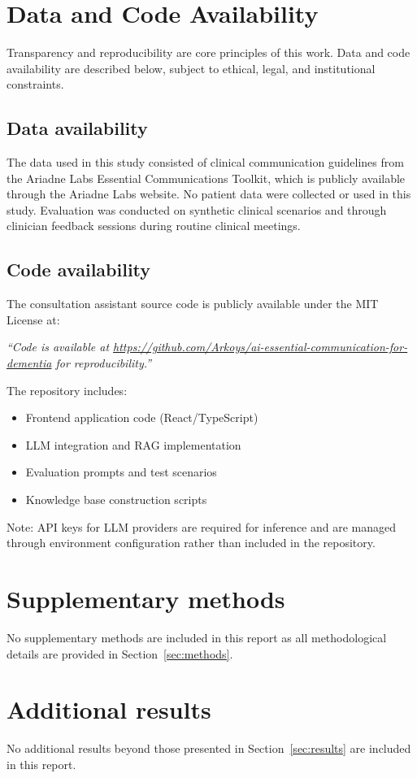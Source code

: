 \section*{Data and Code Availability}

Transparency and reproducibility are core principles of this work.
Data and code availability are described below,
subject to ethical, legal, and institutional constraints.

\subsection*{Data availability}

The data used in this study consisted of clinical communication guidelines from the Ariadne Labs Essential Communications Toolkit, which is publicly available through the Ariadne Labs website. No patient data were collected or used in this study. Evaluation was conducted on synthetic clinical scenarios and through clinician feedback sessions during routine clinical meetings.

\subsection*{Code availability}

The consultation assistant source code is publicly available under the MIT License at:

\textit{``Code is available at \url{https://github.com/Arkoys/ai-essential-communication-for-dementia} for reproducibility.''}

The repository includes:
\begin{itemize}
    \item Frontend application code (React/TypeScript)
    \item LLM integration and RAG implementation
    \item Evaluation prompts and test scenarios
    \item Knowledge base construction scripts
\end{itemize}

Note: API keys for LLM providers are required for inference and are managed through environment configuration rather than included in the repository.

\section{Supplementary methods}

No supplementary methods are included in this report as all methodological details are provided in Section~\ref{sec:methods}.

\section{Additional results}

No additional results beyond those presented in Section~\ref{sec:results} are included in this report.
